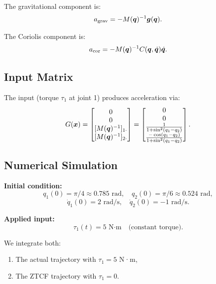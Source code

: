 The gravitational component is:
\begin{equation}
a_{\text{grav}} = -M(\bm{q})^{-1}\bm{g}(\bm{q}).
\label{eq:ch7:drift-grav}
\end{equation}

The Coriolis component is:
\begin{equation}
a_{\text{cor}} = -M(\bm{q})^{-1}C(\bm{q},\dot{\bm{q}})\dot{\bm{q}}.
\label{eq:ch7:drift-cor}
\end{equation}

\subsection{Input Matrix}

The input (torque $\tau_1$ at joint 1) produces acceleration via:
\begin{equation}
G(\x) = \begin{bmatrix}
0 \\ 0 \\ [M(\q)^{-1}]_{1\cdot}\\
[M(\q)^{-1}]_{2\cdot}
\end{bmatrix} = \begin{bmatrix}
0 \\ 0 \\ \frac{1}{1+\sin^2(q_1-q_2)}\\
\frac{-\cos(q_1-q_2)}{1+\sin^2(q_1-q_2)}
\end{bmatrix}.
\label{eq:ch7:input-matrix}
\end{equation}

\subsection{Numerical Simulation}

\textbf{Initial condition:}
\begin{equation}
q_1(0) = \pi/4 \approx 0.785 \text{ rad}, \quad q_2(0) = \pi/6 \approx 0.524 \text{ rad},
\end{equation}
\begin{equation}
\dot{q}_1(0) = 2 \text{ rad/s}, \quad \dot{q}_2(0) = -1 \text{ rad/s}.
\label{eq:ch7:initial-condition}
\end{equation}

\textbf{Applied input:}
\begin{equation}
\tau_1(t) = 5 \text{ N·m} \quad \text{(constant torque)}.
\end{equation}

We integrate both:
\begin{enumerate}
\item The actual trajectory with $\tau_1 = 5$ N·m,
\item The ZTCF trajectory with $\tau_1 = 0$.
\end{enumerate}

